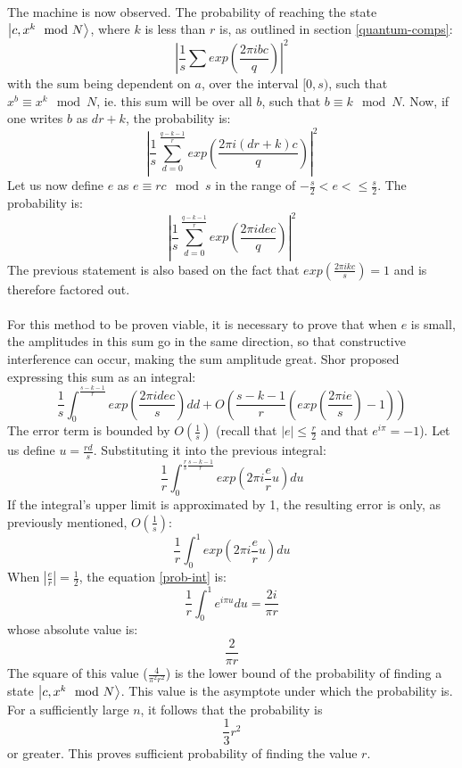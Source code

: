 \documentclass[a4paper, 10pt]{article}
\begin{document}
\paragraph*{}
The machine is now observed. The probability of reaching the state $\ket{c, x^k \mod N}$, where $k$ is less than $r$ 
is, as outlined in section \ref{quantum-comps}:
$$\left| \frac{1}{s} \sum exp \left( \frac{2 \pi i b c}{q} \right) \right|^2$$
with the sum being dependent on $a$, over the interval $[0, s)$, such that $x^b \equiv x^k \mod N$, ie. this sum will 
be over all $b$, such that $b \equiv k \mod N$. Now, if one writes $b$ as $dr + k$, the probability is:
$$\left| \frac{1}{s} \sum_{d=0}^{\frac{q - k - 1}{r}} exp \left(\frac{2 \pi i (dr + k) c}{q} \right) \right|^2$$
Let us now define $e$ as $e \equiv rc \mod s$ in the range of $-\frac{s}{2} < e < \leq \frac{s}{2}$. The probability 
is:
$$\left| \frac{1}{s} \sum_{d=0}^{\frac{q - k - 1}{r}} exp \left(\frac{2 \pi i d e c}{q} \right) \right|^2$$
The previous statement is also based on the fact that $exp(\frac{2 \pi i k c}{s}) = 1$ and is therefore factored out.

\paragraph*{}
For this method to be proven viable, it is necessary to prove that when $e$ is small, the amplitudes in this sum go in 
the same direction, so that constructive interference can occur, making the sum amplitude great. Shor proposed 
expressing this sum as an integral:
$$\frac{1}{s} \int_{0}^{\frac{s - k - 1}{r}} exp \left(\frac{2 \pi i d e c}{s} \right) dd + O \left(\frac{s - k - 1}{r} 
\left(exp \left(\frac{2 \pi i e}{s} \right) - 1 \right) \right)$$
The error term is bounded by $O(\frac{1}{s})$ (recall that $|e| \leq \frac{r}{2}$ and that $e^{i \pi} = -1$). Let us 
define $u = \frac{rd}{s}$. Substituting it into the previous integral:
$$\frac{1}{r} \int_{0}^{\frac{r}{s} \frac{s - k - 1}{r}} exp \left(2 \pi i\frac{e}{r} u \right) du$$
If the integral's upper limit is approximated by 1, the resulting error is only, as previously mentioned, 
$O(\frac{1}{s})$:
\begin{equation} \label{prob-int}
\frac{1}{r} \int_{0}^{1} exp \left(2 \pi i\frac{e}{r} u \right) du
\end{equation}
When $|\frac{e}{r}| = \frac{1}{2}$, the equation \ref{prob-int} is:
$$\frac{1}{r} \int_{0}^{1} e^{i \pi u} du = \frac{2i}{\pi r}$$
whose absolute value is:
$$\frac{2}{\pi r}$$
The square of this value ($\frac{4}{\pi^2 r^2}$) is the lower bound of the probability of finding a state 
$\ket{c, x^k \mod N}$. This value is the asymptote under which the probability is. For a sufficiently large $n$, it 
follows that the probability is
$$\frac{1}{3}r^2$$
or greater. This proves sufficient probability of finding the value $r$.
\end{document}
